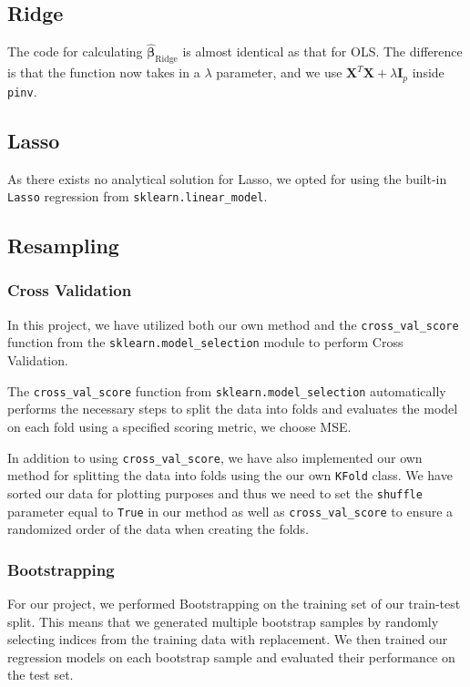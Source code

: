 \documentclass{article}
\begin{document}
\subsection{Ridge}
The code for calculating $\boldsymbol{\hat{\beta}}_\text{Ridge}$ is almost identical as that for OLS. The difference is that the function now takes in a $\lambda$ parameter, and we use $\textbf{X}^T \textbf{X} + \lambda \boldsymbol{I}_p$ inside \verb|pinv|.

\subsection{Lasso}
As there exists no analytical solution for Lasso, we opted for using the built-in \verb|Lasso| regression from \verb|sklearn.linear_model|.

\subsection{Resampling}
\subsubsection{Cross Validation}
 In this project, we have utilized both our own method and the \verb|cross_val_score| function from the \verb|sklearn.model_selection| module to perform Cross Validation.
 
The \verb|cross_val_score| function from \verb|sklearn.model_selection| automatically performs the necessary steps to split the data into folds and evaluates the model on each fold using a specified scoring metric, we choose MSE.

In addition to using \verb|cross_val_score|, we have also implemented our own method for splitting the data into folds using the our own \verb|KFold| class. We have sorted our data for plotting purposes and thus we need to set the \verb|shuffle| parameter equal to \verb|True| in our method as well as \verb|cross_val_score| to ensure a randomized order of the data when creating the folds.

\subsubsection{Bootstrapping}
For our project, we performed Bootstrapping on the training set of our train-test split. This means that we generated multiple bootstrap samples by randomly selecting indices from the training data with replacement. We then trained our regression models on each bootstrap sample and evaluated their performance on the test set.
\end{document}
